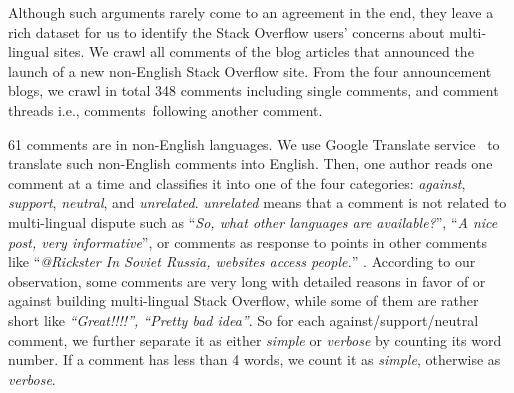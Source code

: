 Although such arguments rarely come to an agreement in the end, they leave a rich dataset for us to identify the Stack Overflow users' concerns about multi-lingual sites.
We crawl all comments of the blog articles that announced the launch of a new non-English Stack Overflow site.
From the four announcement blogs, we crawl in total 348 comments including single comments, and comment threads i.e., comments\ following another comment.
\begin{comment}
\textcolor{red}{We count the comments on an article by different users.
If one user has multiple comments on an article, we merge them as one comment ??Please confirm if this is what you mean by ``count it as one''. Does this mean we have 348 users who gave comments? What if a user A's comment is a follow-up on another user's comment? Does it still make sense to merge this comment by A with other comments by A which may talk about very different things? What if one comment is in favor of one thing, the other comment is against the other thing or neural or unrelated. If you merge the two comments as one big comment, how can you classify this big comment? This will also affect the explanation of \% of users or comments are supportive or against below}.
	
\end{comment}

61 comments are in non-English languages.
We use Google Translate service~\cite{web:googleTranslate} to translate such non-English comments into English.
Then, one author reads one comment at a time and classifies it into one of the four categories: \textit{against}, \textit{support}, \textit{neutral}, and \textit{unrelated}.
\textit{unrelated} means that a comment is not related to multi-lingual dispute such as ``\textit{So, what other languages are available?}'', ``\textit{A nice post, very informative}'', or comments as response to points in other comments like ``\textit{@Rickster In Soviet Russia, websites access people.}'' .
According to our observation, some comments are very long with detailed reasons in favor of or against building multi-lingual Stack Overflow, while some of them are rather short like \textit{``Great!!!!'', ``Pretty bad idea''}.
So for each against/support/neutral comment, we further separate it as either \textit{simple} or \textit{verbose} by counting its word number.
If a comment has less than 4 words, we count it as \textit{simple}, otherwise as \textit{verbose}.

